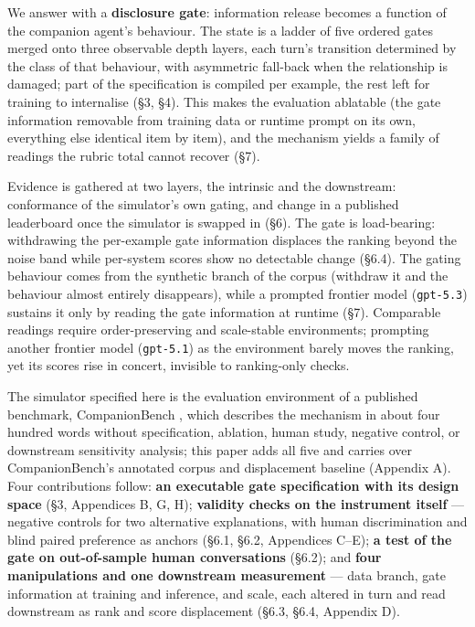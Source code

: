 \documentclass[letterpaper]{article}
\begin{document}
We answer with a \textbf{disclosure gate}: information release becomes a function of the companion agent's behaviour. The state is a ladder of five ordered gates merged onto three observable depth layers, each turn's transition determined by the class of that behaviour, with asymmetric fall-back when the relationship is damaged; part of the specification is compiled per example, the rest left for training to internalise (\S{}3, \S{}4). This makes the evaluation ablatable (the gate information removable from training data or runtime prompt on its own, everything else identical item by item), and the mechanism yields a family of readings the rubric total cannot recover (\S{}7).

Evidence is gathered at two layers, the intrinsic and the downstream: conformance of the simulator's own gating, and change in a published leaderboard once the simulator is swapped in (\S{}6). The gate is load-bearing: withdrawing the per-example gate information displaces the ranking beyond the noise band while per-system scores show no detectable change (\S{}6.4). The gating behaviour comes from the synthetic branch of the corpus (withdraw it and the behaviour almost entirely disappears), while a prompted frontier model (\texttt{gpt-5.3}) sustains it only by reading the gate information at runtime (\S{}7). Comparable readings require order-preserving and scale-stable environments; prompting another frontier model (\texttt{gpt-5.1}) as the environment barely moves the ranking, yet its scores rise in concert, invisible to ranking-only checks.

The simulator specified here is the evaluation environment of a published benchmark, CompanionBench \citep{companionbench}, which describes the mechanism in about four hundred words without specification, ablation, human study, negative control, or downstream sensitivity analysis; this paper adds all five and carries over CompanionBench's annotated corpus and displacement baseline (Appendix A). Four contributions follow: \textbf{an executable gate specification with its design space} (\S{}3, Appendices B, G, H); \textbf{validity checks on the instrument itself} --- negative controls for two alternative explanations, with human discrimination and blind paired preference as anchors (\S{}6.1, \S{}6.2, Appendices C--E); \textbf{a test of the gate on out-of-sample human conversations} (\S{}6.2); and \textbf{four manipulations and one downstream measurement} --- data branch, gate information at training and inference, and scale, each altered in turn and read downstream as rank and score displacement (\S{}6.3, \S{}6.4, Appendix D).
\end{document}
